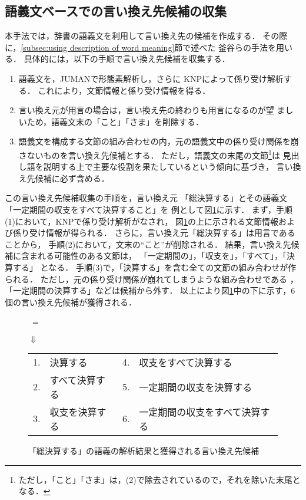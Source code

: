 \subsection{語義文ベースでの言い換え先候補の収集}
\label{subsec:collection}
本手法では，辞書の語義文を利用して言い換え先の候補を作成する．
その際に，\ref{subsec:using description of word meaning}節で述べた
釜谷ら\cite{ipsj02}の手法を用いる．
具体的には，以下の手順で言い換え先候補を収集する．

\begin{enumerate}
 \item 語義文を，JUMAN\cite{kur99}で形態素解析し，さらに
		KNP\cite{kur98}によって係り受け解析する．
		これにより，文節情報と係り受け情報を得る．
  \item 言い換え元が用言の場合は，言い換え先の終わりも用言になるのが望
       ましいため，語義文末の「こと」「さま」を削除する．
  \item 語義文を構成する文節の組み合わせの内，元の語義文中の係り受け関係を崩さないものを言い換え先候補とする．
ただし，語義文の末尾の文節\footnote{ただし，「こと」「さま」は，(2)で除去されているので，それを除いた末尾となる．}は
見出し語を説明する上で主要な役割を果たしているという傾向に基づき，
言い換え先候補に必ず含める．
\end{enumerate}
この言い換え先候補収集の手順を，言い換え元
「総決算する」とその語義文「一定期間の収支をすべて決算すること」を
例として図\ref{sokessanknp}に示す．
まず，手順(1)において，KNPで係り受け解析がなされ，
図\ref{sokessanknp}の上に示される文節情報および係り受け情報が得られる．
さらに，言い換え元「総決算する」は用言であることから，
手順(2)において，文末の``こと''が削除される．
結果，言い換え先候補に含まれる可能性のある文節は，
「一定期間の」，「収支を」，「すべて」，「決算する」
となる．
手順(3)で，「決算する」を含む全ての文節の組み合わせが作られる．
ただし，元の係り受け関係が崩れてしまうような組み合わせである
， 「一定期間の決算する」などは候補から外す．
以上により図\ref{sokessanknp}中の下に示す，6個の言い換え先候補が獲得される．
 
   \begin{figure}[t]
	\begin{center}
	 \begin{minipage}[c]{.4\textwidth}
	  \mbox{
	  \epsfxsize = \textwidth
	  }
	 \end{minipage}

	 {\Large $\Downarrow$}\hspace{50pt}
\vspace{5pt}

\begin{tabular}{clrl}
1. & 決算する& \hspace{20pt}4.& 収支をすべて決算する\\
2. & すべて決算する& 5.& 一定期間の収支を決算する\\
3. & 収支を決算する& 6.& 一定期間の収支をすべて決算する\\
\end{tabular}
	\end{center}
	 \caption{\label{sokessanknp}「総決算する」の語義の解析結果と獲得される言い換え先候補}
   \end{figure}

